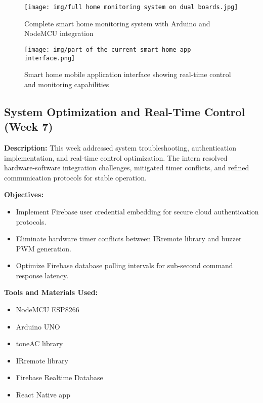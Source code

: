 \documentclass[12pt,a4paper]{report}
\begin{document}
\begin{figure}[H]
\centering
\texttt{[image: img/full home monitoring system on dual boards.jpg]}
\caption{Complete smart home monitoring system with Arduino and NodeMCU integration}
\label{fig:full-system}
\end{figure}

\begin{figure}[H]
\centering
\texttt{[image: img/part of the current smart home app interface.png]}
\caption{Smart home mobile application interface showing real-time control and monitoring capabilities}
\label{fig:mobile-app}
\end{figure}

\subsection{System Optimization and Real-Time Control (Week 7)}

\noindent\textbf{Description:} This week addressed system troubleshooting, authentication implementation, and real-time control optimization. The intern resolved hardware-software integration challenges, mitigated timer conflicts, and refined communication protocols for stable operation.

\noindent\textbf{Objectives:}
\begin{itemize}
    \item Implement Firebase user credential embedding for secure cloud authentication protocols.
    \item Eliminate hardware timer conflicts between IRremote library and buzzer PWM generation.
    \item Optimize Firebase database polling intervals for sub-second command response latency.
\end{itemize}

\noindent\textbf{Tools and Materials Used:}
\begin{multicols}{2}
\begin{itemize}
    \item NodeMCU ESP8266
    \item Arduino UNO
    \item toneAC library
    \item IRremote library
    \item Firebase Realtime Database
    \item React Native app
\end{itemize}
\end{multicols}
\end{document}
